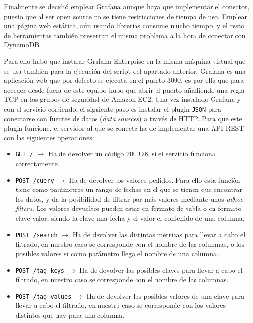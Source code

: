 Finalmente se decidió emplear Grafana aunque haya que implementar el conector, puesto que al ser open source no se tiene restricciones de tiempo de uso. Emplear una página web estática, aún usando librerías consume mucho tiempo, y el resto de herramientas también presentan el mismo problema a la hora de conectar con DynamoDB.

Para ello hubo que instalar Grafana Enterprise en la misma máquina virtual que se usa también para la ejecución del script del apartado anterior. Grafana es una aplicación web que por defecto se ejecuta en el puerto 3000, es por ello que para acceder desde fuera de este equipo hubo que abrir el puerto añadiendo una regla TCP en los grupos de seguridad de Amazon EC2. Una vez instalado Grafana y con el servicio corriendo, el siguiente paso es instalar el plugin \texttt{JSON} para conectarse con fuentes de datos (\textit{data sources}) a través de HTTP. Para que este plugin funcione, el servidor al que se conecte ha de implementar una API REST con las siguientes operaciones:

\begin{itemize}
    \item \texttt{GET /} $\rightarrow$ Ha de devolver un código 200 OK si el servicio funciona correctamente.
    \item \texttt{POST /query} $\rightarrow$ Ha de devolver los valores pedidos. Para ello esta función tiene como parámetros un rango de fechas en el que se tienen que encontrar los datos, y da la posibilidad de filtrar por más valores mediante unos \textit{adhoc filters}. Los valores devueltos pueden estar en formato de tabla o en formato clave-valor, siendo la clave una fecha y el valor el contenido de una columna.
    \item \texttt{POST /search} $\rightarrow$ Ha de devolver las distintas métricas para llevar a cabo el filtrado, en nuestro caso se corresponde con el nombre de las columnas, o los posibles valores si como parámetro llega el nombre de una columna.
    \item \texttt{POST /tag-keys} $\rightarrow$ Ha de devolver las posibles claves para llevar a cabo el filtrado, en nuestro caso se corresponde con el nombre de las columnas.
    \item \texttt{POST /tag-values} $\rightarrow$ Ha de devolver los posibles valores de una clave para llevar a cabo el filtrado, en nuestro caso se corresponde con los valores distintos que hay para una columna.
\end{itemize}

